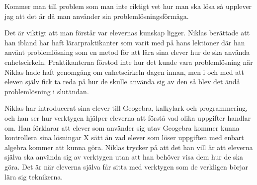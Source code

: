 \begin{displayquote}
\textcolor{turkos}{
Kommer man till problem som man inte riktigt vet hur man ska lösa så upplever jag att det är då man använder sin problemlösningsförmåga.
}
\end{displayquote}

\textcolor{turkos}{
Det är viktigt att man förstår var elevernas kunskap ligger. Niklas berättade att han ibland har haft lärarpraktikanter som varit med på hans lektioner där han använt problemlösning som en metod för att lära sina elever hur de ska använda enhetscirkeln. Praktikanterna förstod inte hur det kunde vara problemlösning när Niklas hade haft genomgång om enhetscirkeln dagen innan, men i och med att eleven själv fick ta reda på hur de skulle använda sig av den så blev det ändå problemlösning i slutändan. 
}

\textcolor{turkos}{
Niklas har introducerat sina elever till Geogebra, kalkylark och programmering, och han ser hur verktygen hjälper eleverna att förstå vad olika uppgifter handlar om. Han förklarar att elever som använder sig utav Geogebra kommer kunna kontrollera sina lösningar X sätt än vad elever som löser uppgiften med enbart algebra kommer att kunna göra. Niklas trycker på att det han vill är att eleverna själva ska använda sig av verktygen utan att han behöver visa dem hur de ska göra. Det är när eleverna själva får sitta med verktygen som de verkligen börjar lära sig teknikerna.
} 

